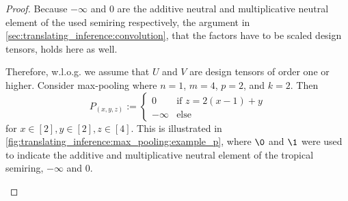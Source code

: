 \begin{proof}
    Because $-\infty$ and $0$ are the additive neutral and multiplicative neutral element of the used semiring respectively,
    the argument in \autoref{sec:translating_inference:convolution}, that the factors have to be scaled design tensors, holds here as well.

    Therefore, w.l.o.g. we assume that $U$ and $V$ are design tensors of order one or higher.
    Consider max-pooling where $n = 1$, $m = 4$, $p = 2$, and $k = 2$.
    Then
    $$P_{(x,y,z)} := \begin{cases}
        0 & \text{if } z = 2 (x - 1) + y\\
        -\infty & \text{else}
    \end{cases}$$
    for $x \in [2], y \in [2], z \in [4]$.
    This is illustrated in \autoref{fig:translating_inference:max_pooling:example_p}, where $\0$ and $\1$ were used to indicate the additive and multiplicative neutral element of the tropical semiring, $-\infty$ and $0$.
    \begin{figure}
        \centering
\end{figure}
\end{proof}
